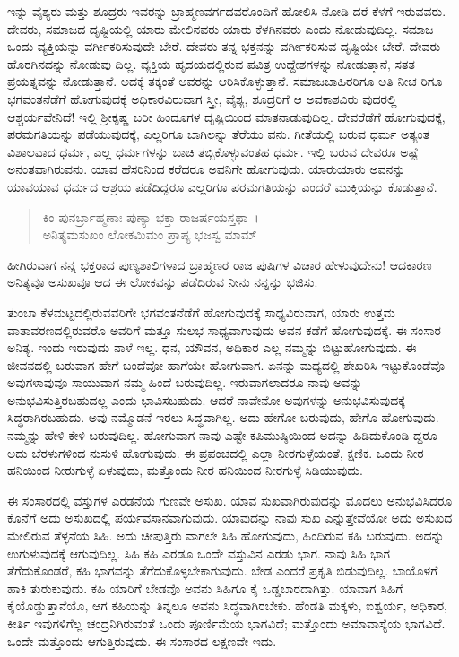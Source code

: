 ಇನ್ನು ವೈಶ್ಯರು ಮತ್ತು ಶೂದ್ರರು ಇವರನ್ನು ಬ್ರಾಹ್ಮಣವರ್ಗದವರೊಂದಿಗೆ ಹೋಲಿಸಿ ನೋಡಿ ದರೆ ಕೆಳಗೆ ಇರುವವರು. ದೇವರು, ಸಮಾಜದ ದೃಷ್ಟಿಯಲ್ಲಿ ಯಾರು ಮೇಲಿನವರು ಯಾರು ಕೆಳಗಿನವರು ಎಂದು ನೋಡುವುದಿಲ್ಲ. ಸಮಾಜ ಒಂದು ವ್ಯಕ್ತಿಯನ್ನು ವರ್ಗೀಕರಿಸುವುದೇ ಬೇರೆ. ದೇವರು ತನ್ನ ಭಕ್ತನನ್ನು ವರ್ಗೀಕರಿಸುವ ದೃಷ್ಟಿಯೇ ಬೇರೆ. ದೇವರು ಹೊರಗಿನದನ್ನು ನೋಡುವು ದಿಲ್ಲ. ವ್ಯಕ್ತಿಯ ಹೃದಯದಲ್ಲಿರುವ ಪವಿತ್ರ ಉದ್ದೇಶಗಳನ್ನು ನೋಡುತ್ತಾನೆ, ಸತತ ಪ್ರಯತ್ನವನ್ನು ನೋಡುತ್ತಾನೆ. ಅದಕ್ಕೆ ತಕ್ಕಂತೆ ಅವರನ್ನು ಆರಿಸಿಕೊಳ್ಳುತ್ತಾನೆ. ಸಮಾಜಬಾಹಿರರಿಗೂ ಅತಿ ನೀಚ ರಿಗೂ ಭಗವಂತನೆಡೆಗೆ ಹೋಗುವುದಕ್ಕೆ ಅಧಿಕಾರವಿರುವಾಗ ಸ್ತ್ರೀ, ವೈಶ್ಯ, ಶೂದ್ರರಿಗೆ ಆ ಅವಕಾಶವಿರು ವುದರಲ್ಲಿ ಆಶ್ಚರ್ಯವೇನಿದೆ! ಇಲ್ಲಿ ಶ‍್ರೀಕೃಷ್ಣ ಬರೀ ಹಿಂದೂಗಳ ದೃಷ್ಟಿಯಿಂದ ಮಾತನಾಡುವುದಿಲ್ಲ. ದೇವರೆಡೆಗೆ ಹೋಗುವುದಕ್ಕೆ, ಪರಮಗತಿಯನ್ನು ಪಡೆಯುವುದಕ್ಕೆ, ಎಲ್ಲರಿಗೂ ಬಾಗಿಲನ್ನು ತೆರೆಯು ವನು. ಗೀತೆಯಲ್ಲಿ ಬರುವ ಧರ್ಮ ಅತ್ಯಂತ ವಿಶಾಲವಾದ ಧರ್ಮ, ಎಲ್ಲ ಧರ್ಮಗಳನ್ನು ಬಾಚಿ ತಬ್ಬಿಕೊಳ್ಳುವಂತಹ ಧರ್ಮ. ಇಲ್ಲಿ ಬರುವ ದೇವರೂ ಅಷ್ಟೆ ಅನಂತವಾಗಿರುವನು. ಯಾವ ಹೆಸರಿನಿಂದ ಕರೆದರೂ ಅವನಿಗೇ ಹೋಗುವುದು. ಯಾರುಯಾರು ಅವನನ್ನು ಯಾವಯಾವ ಧರ್ಮದ ಆಶ್ರಯ ಪಡೆದಿದ್ದರೂ ಎಲ್ಲರಿಗೂ ಪರಮಗತಿಯನ್ನು ಎಂದರೆ ಮುಕ್ತಿಯನ್ನು ಕೊಡುತ್ತಾನೆ.

\begin{verse}
ಕಿಂ ಪುನರ್ಬ್ರಾಹ್ಮಣಾಃ ಪುಣ್ಯಾ ಭಕ್ತಾ ರಾಜರ್ಷಯಸ್ತಥಾ~।\\ಅನಿತ್ಯಮಸುಖಂ ಲೋಕಮಿಮಂ ಪ್ರಾಪ್ಯ ಭಜಸ್ವ ಮಾಮ್ 
\end{verse}

{\small ಹೀಗಿರುವಾಗ ನನ್ನ ಭಕ್ತರಾದ ಪುಣ್ಯಶಾಲಿಗಳಾದ ಬ್ರಾಹ್ಮಣರ ರಾಜ ಪುಷಿಗಳ ವಿಚಾರ ಹೇಳುವುದೇನು! ಆದಕಾರಣ ಅನಿತ್ಯವೂ ಅಸುಖವೂ ಆದ ಈ ಲೋಕವನ್ನು ಪಡೆದಿರುವ ನೀನು ನನ್ನನ್ನು ಭಜಿಸು.}

ತುಂಬಾ ಕೆಳಮಟ್ಟದಲ್ಲಿರುವವರಿಗೇ ಭಗವಂತನೆಡೆಗೆ ಹೋಗುವುದಕ್ಕೆ ಸಾಧ್ಯವಿರುವಾಗ, ಯಾರು ಉತ್ತಮ ವಾತಾವರಣದಲ್ಲಿರುವರೊ ಅವರಿಗೆ ಮತ್ತೂ ಸುಲಭ ಸಾಧ್ಯವಾಗುವುದು ಅವನ ಕಡೆಗೆ ಹೋಗುವುದಕ್ಕೆ. ಈ ಸಂಸಾರ ಅನಿತ್ಯ. ಇಂದು ಇರುವುದು ನಾಳೆ ಇಲ್ಲ. ಧನ, ಯೌವನ, ಅಧಿಕಾರ ಎಲ್ಲ ನಮ್ಮನ್ನು ಬಿಟ್ಟುಹೋಗುವುದು. ಈ ಜೀವನದಲ್ಲಿ ಬರುವಾಗ ಹೇಗೆ ಬಂದೆವೋ ಹಾಗೆಯೇ ಹೋಗುವಾಗ. ಏನನ್ನು ಮಧ್ಯದಲ್ಲಿ ಶೇಖರಿಸಿ ಇಟ್ಟುಕೊಂಡೆವೊ ಅವುಗಳಾವುವೂ ಸಾಯುವಾಗ ನಮ್ಮ ಹಿಂದೆ ಬರುವುದಿಲ್ಲ. ಇರುವಾಗಲಾದರೂ ನಾವು ಅವನ್ನು ಅನುಭವಿಸುತ್ತಿರಬಹುದಲ್ಲ ಎಂದು ಭಾವಿಸಬಹುದು. ಆದರೆ ನಾವೇನೋ ಅವುಗಳನ್ನು ಅನುಭವಿಸುವುದಕ್ಕೆ ಸಿದ್ಧರಾಗಿರಬಹುದು. ಅವು ನಮ್ಮೊಡನೆ ಇರಲು ಸಿದ್ಧವಾಗಿಲ್ಲ. ಅದು ಹೇಗೋ ಬರುವುದು, ಹೇಗೊ ಹೋಗುವುದು. ನಮ್ಮನ್ನು ಹೇಳಿ ಕೇಳಿ ಬರುವುದಿಲ್ಲ. ಹೋಗುವಾಗ ನಾವು ಎಷ್ಟೇ ಕಪಿಮುಷ್ಠಿಯಿಂದ ಅದನ್ನು ಹಿಡಿದುಕೊಂಡಿ ದ್ದರೂ ಅದು ಬೆರಳುಗಳಿಂದ ನುಸುಳಿ ಹೋಗುವುದು. ಈ ಪ್ರಪಂಚದಲ್ಲಿ ಎಲ್ಲಾ ನೀರಗುಳ್ಳೆಯಂತೆ, ಕ್ಷಣಿಕ. ಒಂದು ನೀರ ಹನಿಯಿಂದ ನೀರುಗುಳ್ಳೆ ಏಳುವುದು, ಮತ್ತೊಂದು ನೀರ ಹನಿಯಿಂದ ನೀರಗುಳ್ಳೆ ಸಿಡಿಯುವುದು.

ಈ ಸಂಸಾರದಲ್ಲಿ ವಸ್ತುಗಳ ಎರಡನೆಯ ಗುಣವೇ ಅಸುಖ. ಯಾವ ಸುಖವಾಗಿರುವುದನ್ನು ಮೊದಲು ಅನುಭವಿಸಿದರೂ ಕೊನೆಗೆ ಅದು ಅಸುಖದಲ್ಲಿ ಪರ್ಯವಸಾನವಾಗುವುದು. ಯಾವುದನ್ನು ನಾವು ಸುಖ ಎನ್ನುತ್ತೇವೆಯೋ ಅದು ಅಸುಖದ ಮೇಲಿರುವ ತೆಳ್ಳನೆಯ ಸಿಹಿ. ಅದು ಚೀಪುತ್ತಿರು ವಾಗಲೇ ಸಿಹಿ ಹೋಗುವುದು, ಹಿಂದಿರುವ ಕಹಿ ಬರುವುದು. ಅದನ್ನು ಉಗುಳುವುದಕ್ಕೆ ಆಗುವುದಿಲ್ಲ. ಸಿಹಿ ಕಹಿ ಎರಡೂ ಒಂದೇ ವಸ್ತುವಿನ ಎರಡು ಭಾಗ. ನಾವು ಸಿಹಿ ಭಾಗ ತೆಗೆದುಕೊಂಡರೆ, ಕಹಿ ಭಾಗವನ್ನು ತೆಗೆದುಕೊಳ್ಳಬೇಕಾಗುವುದು. ಬೇಡ ಎಂದರೆ ಪ್ರಕೃತಿ ಬಿಡುವುದಿಲ್ಲ. ಬಾಯೊಳಗೆ ಹಾಕಿ ತುರುಕುವುದು. ಕಹಿ ಯಾರಿಗೆ ಬೇಡವೊ ಅವನು ಸಿಹಿಗೂ ಕೈ ಒಡ್ಡಬಾರದಾಗಿತ್ತು. ಯಾವಾಗ ಸಿಹಿಗೆ ಕೈಯೊಡ್ಡುತ್ತಾನೆಯೊ, ಆಗ ಕಹಿಯನ್ನು ತಿನ್ನಲೂ ಅವನು ಸಿದ್ಧವಾಗಿರಬೇಕು. ಹೆಂಡತಿ ಮಕ್ಕಳು, ಐಶ್ವರ್ಯ, ಅಧಿಕಾರ, ಕೀರ್ತಿ ಇವುಗಳಿಗೆಲ್ಲ ಚಂದ್ರನಿಗಿರುವಂತೆ ಒಂದು ಪೂರ್ಣಿಮೆಯ ಭಾಗವಿದೆ; ಮತ್ತೊಂದು ಅಮಾವಾಸ್ಯೆಯ ಭಾಗವಿದೆ. ಒಂದೇ ಮತ್ತೊಂದು ಆಗುತ್ತಿರುವುದು. ಈ ಸಂಸಾರದ ಲಕ್ಷಣವೇ ಇದು. 

